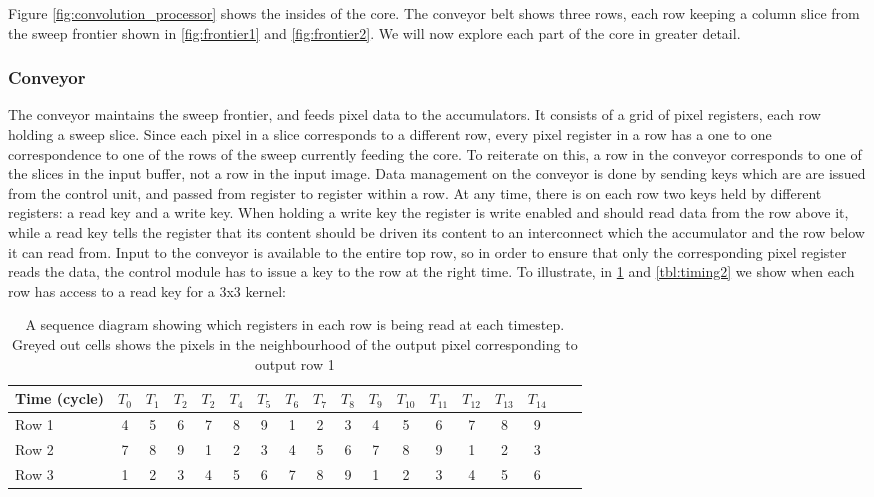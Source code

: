 Figure \ref{fig:convolution_processor} shows the insides of the core. 
The conveyor belt shows three rows, each row keeping a column slice from the sweep frontier shown in \ref{fig:frontier1} and \ref{fig:frontier2}.
We will now explore each part of the core in greater detail.

\subsubsection{Conveyor}
The conveyor maintains the sweep frontier, and feeds pixel data to the accumulators.
It consists of a grid of pixel registers, each row holding a sweep slice.
Since each pixel in a slice corresponds to a different row, every pixel register in a row has a one to one correspondence to one of the rows of the sweep currently feeding the core.
To reiterate on this, a row in the conveyor corresponds to one of the slices in the input buffer, not a row in the input image.
Data management on the conveyor is done by sending keys which are are issued from the control unit, and passed from register to register within a row.
At any time, there is on each row two keys held by different registers: a read key and a write key.
When holding a write key the register is write enabled and should read data from the row above it, while a read key tells the register that its content should be driven its content to an interconnect which the accumulator and the row below it can read from.
Input to the conveyor is available to the entire top row, so in order to ensure that only the corresponding pixel register reads the data, the control module has to issue a key to the row at the right time.
To illustrate, in \ref{tbl:timing1} and \ref{tbl:timing2} we show when each row has access to a read key for a 3x3 kernel:
\begin{table}[h]
    \begin{tabular}{l*{16}{c}r}
    Time (cycle)        & $T_{0}$ & $T_{1}$ & $T_{2}$ & $T_{2}$ & $T_{4}$  & $T_{5}$ & $T_{6}$ & $T_{7}$ & $T_{8}$ & $T_{9}$ & $T_{10}$ & $T_{11}$ & $T_{12}$ & $T_{13}$ & $T_{14}$\\
    \hline
    Row 1                   & 4 & 5 & 6 & 7 & 8 & 9 & \cellcolor{gray75} 1 & \cellcolor{gray75} 2 & \cellcolor{gray75} 3 & 4 & 5 & 6 & 7 & 8 & 9 & \\
    Row 2                   & 7 & 8 & 9 & \cellcolor{gray75} 1 & \cellcolor{gray75} 2 & \cellcolor{gray75} 3 & 4 & 5 & 6 & 7 & 8 & 9 & \cellcolor{gray75} 1 & \cellcolor{gray75} 2 & \cellcolor{gray75} 3 & \\
    Row 3                   & \cellcolor{gray75} 1 & \cellcolor{gray75} 2 & \cellcolor{gray75} 3 & 4 & 5 & 6 & 7 & 8 & 9 & \cellcolor{gray75} 1 & \cellcolor{gray75} 2 & \cellcolor{gray75} 3 & 4 & 5 & 6 & \\
    \end{tabular}
    \caption{A sequence diagram showing which registers in each row is being read at each timestep. Greyed out cells shows the pixels in the neighbourhood of the output pixel corresponding to output row 1}
    \label{tbl:timing1}
\end{table}
